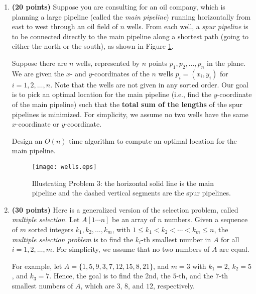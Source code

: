 \documentclass[11pt]{article}
\begin{document}
\begin{enumerate}
\item
{\bf (20 points)}
Suppose you are consulting for an oil company, which is planning a
large pipeline (called the {\em main pipeline}) running horizontally from east to west through
an oil field of $n$ wells. From each well, a {\em spur pipeline} is to
be connected directly to the main pipeline along a shortest path
(going to either the north or the south), as shown in Figure
\ref{fig:wells}.

Suppose there are $n$ wells, represented by $n$ points $p_1,p_2,\ldots,p_n$ in the plane.
We are given the $x$- and $y$-coordinates of the $n$ wells $p_i=(x_i,y_i)$ for $i=1,2,\ldots,n$. Note that the wells are not given in any sorted order. Our goal is to pick an optimal location for the main pipeline (i.e., find the $y$-coordinate of the main pipeline) such that the
{\bf total sum of the lengths} of the spur pipelines is minimized. For simplicity, we assume no two wells have the same $x$-coordinate or $y$-coordinate.

Design an $O(n)$ time algorithm to compute an optimal location for the
main pipeline.



\begin{figure}[h]
\begin{minipage}[t]{\linewidth}
\begin{center}
\texttt{[image: wells.eps]}
\caption{Illustrating Problem 3: the horizontal solid line is the main pipeline and the dashed vertical segments are the spur pipelines.}\label{fig:wells}
\end{center}
\end{minipage}
\end{figure}



\item
{\bf (30 points)}
Here is a generalized version of the selection problem, called {\em multiple selection}. Let $A[1\cdots n]$ be an array of $n$ numbers. Given a sequence of $m$ sorted integers $k_1, k_2,\ldots, k_m$, with $1\leq k_1<k_2<\cdots<k_m\leq n$, the {\em multiple selection problem} is to find the $k_i$-th smallest number in $A$ for all $i=1,2,\ldots,m$. For simplicity, we assume that no two numbers of $A$ are equal.

For example, let $A=\{1, 5, 9, 3, 7, 12, 15, 8, 21\}$, and $m=3$ with
$k_1 = 2$, $k_2 = 5$, and $k_3=7$. Hence, the goal is to find the 2nd,
the $5$-th, and the $7$-th smallest numbers of $A$, which are $3$,
$8$, and $12$, respectively.


\end{enumerate}
\end{document}
